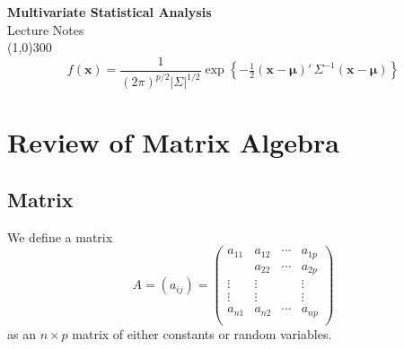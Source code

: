 \documentclass[11pt,a4paper]{article}
\theoremstyle{definition}
\begin{document}
\begin{titlepage}
\begin{center}
\vspace*{3cm}
{\Huge\bfseries Multivariate Statistical Analysis}\\[1.2cm]
{\large Lecture Notes}\\[2.5cm]
\line(1,0){300}\\[1.5cm]
$$f(\mathbf{x}) = \frac{1}{(2\pi)^{p/2}\left|\Sigma\right|^{1/2}}
\exp\left\{-\tfrac{1}{2}(\mathbf{x}-\boldsymbol{\mu})'\,\Sigma^{-1}
(\mathbf{x}-\boldsymbol{\mu})\right\}$$
\end{center}
\end{titlepage}



\pagestyle{fancy}
\fancyhead{}
\fancyfoot{}
\fancyhead[R]{\rightmark\qquad  \thepage}
\renewcommand{\headrulewidth}{0pt}


\textcolor{blue}\tableofcontents
\thispagestyle{empty}
\clearpage
\setcounter{page}{1}





\section{Review of Matrix Algebra}
\subsection{Matrix}
We define a matrix \begin{equation}\tag{1}
A = (a_{ij}) = 
\begin{pmatrix}
a_{11} & a_{12} & \cdots& a_{1p}\\
       & a_{22} & \cdots& a_{2p}\\
\vdots & \vdots &                    & \vdots\\
\vdots & \vdots &                    & \vdots\\
a_{n1} & a_{n2} & \cdots& a_{np}\\           
\end{pmatrix}
\end{equation}
as an $n\times p$ matrix of either constants or random variables.\\
\end{document}
